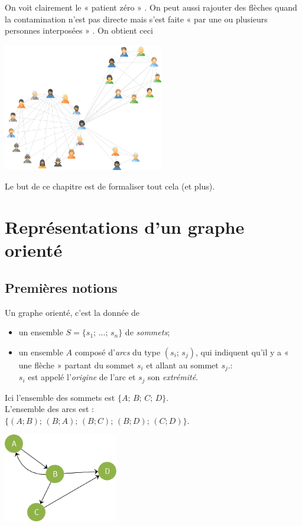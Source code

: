 On voit clairement le  «  patient zéro » . On peut aussi rajouter des flèches quand la contamination n'est pas directe mais s'est faite  «  par une ou plusieurs personnes interposées » . On obtient ceci
\begin{center}
    \includegraphics[width=7cm]{graphes/img/graphe2_transitif.png}
\end{center}
Le but de ce chapitre est de formaliser tout cela (et plus).

\section{Représentations d'un graphe orienté}
\subsection{Premières notions}
\begin{definition}
    Un graphe orienté, c'est la donnée de
    \begin{itemize}
        \item 	un ensemble $S=\lbrace s_1;\,...;\,s_n\rbrace$ de \textit{sommets};
        \item 	un ensemble $A$ composé d'\textit{arcs} du type $(s_i;\,s_j)$, qui indiquent qu'il y a  «  une flèche »  partant du sommet $s_i$ et allant au sommet $s_j$.:\\ $s_i$ est appelé l'\textit{origine} de l'arc et $s_j$ son \textit{extrémité}.
    \end{itemize}
\end{definition}

\begin{exemple}[]
    Ici l'ensemble des sommets est $\lbrace A;\,B;\,C;\,D\rbrace$.\\
    L'ensemble des arcs est :\\
    $\lbrace (A;B);\,(B;A);\,(B;C);\,(B;D);\,(C;D)\rbrace$.
    \begin{center}
        \includegraphics[width=5cm]{graphes/img/ex_graphe_oriente.png}
    \end{center}
\end{exemple}

